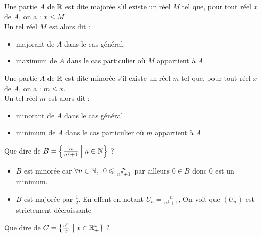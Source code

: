 \begin{defi}
	Une partie \(A\) de \(\mathbb{R}\) est dite majorée s’il existe un réel \(M\) tel que, pour tout réel \(x\) de \(A\), on a : \(x \leq M\). \\
	Un tel réel \(M\) est alors dit :
	\begin{itemize}
		\item majorant de \(A\) dans le cas général. \\
		\item maximum de \(A\) dans le cas particulier où \(M\) appartient à \(A\).\\
	\end{itemize}

\end{defi}

\begin{defi}
	Une partie \(A\) de \(\mathbb{R}\) est dite minorée s’il existe un réel \(m\) tel que, pour tout réel \(x\) de \(A\), on a : \(m\leq x\). \\
	Un tel réel \(m\) est alors dit :
	\begin{itemize}
		\item minorant  de \(A\) dans le cas général. \\
		\item minimum  de \(A\) dans le cas particulier où \(m\) appartient à \(A\).\\
	\end{itemize}

\end{defi}

\begin{exoex}
	Que dire de \(B = \left\lbrace\frac{n}{n^2+1} \;\middle|\; n \in \mathbb{N}\right\rbrace\) ?
\end{exoex}

\begin{corr}
	\begin{itemize}

		\item \(B\) est minorée car \( \quantifs{\forall n \in \N} 0 \leq \frac{n}{n^2+1} \) par ailleurs \(0 \in B\) donc \(0\) est un minimum. \\
		\item \(B\) est majorée par \(\frac{1}{2}\). En effent en notant \(U_n = \frac{n}{n^2+1}\), On voit que \((U_n)\) est strictement décroissante
	\end{itemize}
\end{corr}

\begin{exoex}
	Que dire de \(C = \left\lbrace\frac{\mathrm{e}^{x}}{x} \;\middle|\; x \in \mathbb{R}_+^*\right\rbrace\) ?
\end{exoex}

